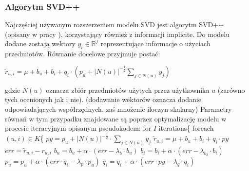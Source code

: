 \documentclass{pracamgr}
\begin{document}
    \subsubsection{Algorytm SVD++}
     Najczęściej używanym rozszerzeniem modelu SVD jest algorytm SVD++ (opisany w pracy \cite{SVD++}), korzystający również z informacji implicite.
     Do modelu dodane zostają wektory $y_i\in\mathbb{R}^f$ reprezentujące informacje o użyciach przedmiotów.
     Równanie docelowe przyjmuje postać:
     \begin{center}
      $\tilde{r}_{u,i}=\mu+b_u+b_i+q_i\cdot\left(p_u +|N(u)|^{-\frac{1}{2}}\sum\limits_{j\in N(u)}y_j\right)$
     \end{center}
     gdzie $N(u)$ oznacza zbiór przedmiotów użytych przez użytkownika $u$ (zarówno tych ocenionych jak i nie).\newline
     {\scriptsize
      (dodawanie wektorów oznacza dodanie odpowiadających współrzędnych, zaś mnożenie iloczyn skalarny)
     }\newline
     Parametry równań w tym przypadku znajdowane są poprzez optymalizację modelu w procesie iteracyjnym opisanym pseudokodem:\newline\newline
     \hspace*{16pt}	for $I$ iterations\{\newline
     \hspace*{32pt}		foreach $(u,i)\in K$\{\newline
     \hspace*{48pt}			$py=p_u +|N(u)|^{-\frac{1}{2}}\cdot\sum\limits_{j\in N(u)}y_j$\newline
     \hspace*{48pt}			$\tilde{r}_{u,i}=\mu+b_u+b_i+q_i\cdot py$\newline
     \hspace*{48pt}			$err=\tilde{r}_{u,i}-r_{u,i}$\newline
     \hspace*{48pt}			$b_u=b_u+\alpha\cdot(err-\lambda_b\cdot b_u)$\newline
     \hspace*{48pt}			$b_i=b_i+\alpha\cdot(err-\lambda_{b_2}\cdot b_i)$\newline
     \hspace*{48pt}			$p_u=p_u+\alpha\cdot(err\cdot q_i-\lambda_p\cdot p_u)$\newline
     \hspace*{48pt}			$q_i=q_i+\alpha\cdot(err\cdot py-\lambda_q\cdot q_i)$\newline
\end{document}
